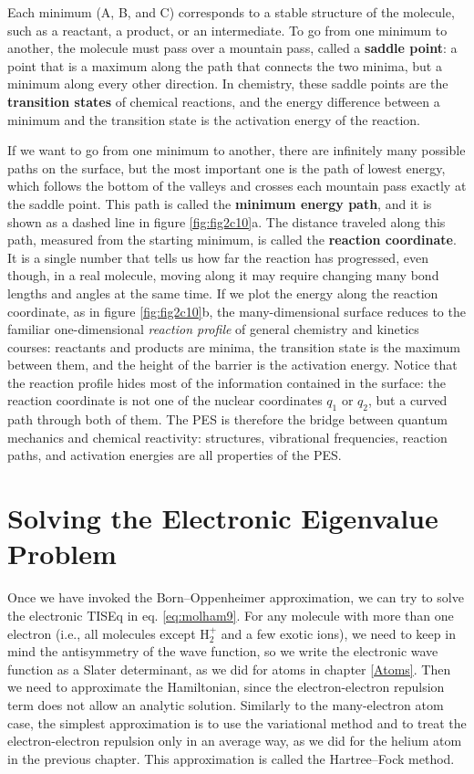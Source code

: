 \documentclass[
  english,
  9pt,
]{extbook}
\theoremstyle{definition}
\theoremstyle{definition}
\theoremstyle{definition}
\theoremstyle{definition}
\theoremstyle{remark}
\begin{document}
Each minimum (A, B, and C) corresponds to a stable structure of the molecule, such as a reactant, a product, or an intermediate. To go from one minimum to another, the molecule must pass over a mountain pass, called a \textbf{saddle point}: a point that is a maximum along the path that connects the two minima, but a minimum along every other direction. In chemistry, these saddle points are the \textbf{transition states} of chemical reactions, and the energy difference between a minimum and the transition state is the activation energy of the reaction.

If we want to go from one minimum to another, there are infinitely many possible paths on the surface, but the most important one is the path of lowest energy, which follows the bottom of the valleys and crosses each mountain pass exactly at the saddle point. This path is called the \textbf{minimum energy path}, and it is shown as a dashed line in figure \ref{fig:fig2c10}a. The distance traveled along this path, measured from the starting minimum, is called the \textbf{reaction coordinate}. It is a single number that tells us how far the reaction has progressed, even though, in a real molecule, moving along it may require changing many bond lengths and angles at the same time. If we plot the energy along the reaction coordinate, as in figure \ref{fig:fig2c10}b, the many-dimensional surface reduces to the familiar one-dimensional \emph{reaction profile} of general chemistry and kinetics courses: reactants and products are minima, the transition state is the maximum between them, and the height of the barrier is the activation energy. Notice that the reaction profile hides most of the information contained in the surface: the reaction coordinate is not one of the nuclear coordinates \(q_1\) or \(q_2\), but a curved path through both of them. The PES is therefore the bridge between quantum mechanics and chemical reactivity: structures, vibrational frequencies, reaction paths, and activation energies are all properties of the PES.

\section{Solving the Electronic Eigenvalue Problem}\label{solving-the-electronic-eigenvalue-problem}

Once we have invoked the Born--Oppenheimer approximation, we can try to solve the electronic TISEq in eq. \eqref{eq:molham9}. For any molecule with more than one electron (i.e., all molecules except \(\mathrm{H}_2^+\) and a few exotic ions), we need to keep in mind the antisymmetry of the wave function, so we write the electronic wave function as a Slater determinant, as we did for atoms in chapter \ref{Atoms}. Then we need to approximate the Hamiltonian, since the electron-electron repulsion term does not allow an analytic solution. Similarly to the many-electron atom case, the simplest approximation is to use the variational method and to treat the electron-electron repulsion only in an average way, as we did for the helium atom in the previous chapter. This approximation is called the Hartree--Fock method.
\end{document}
